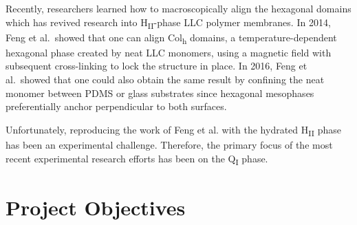 \documentclass{article}
\begin{document}

  Recently, researchers learned how to macroscopically align the hexagonal 
  domains which has revived research into H\textsubscript{II}-phase LLC
  polymer membranes. In 2014, Feng et al.~showed that one can align Col\textsubscript{h}
  domains, a temperature-dependent hexagonal phase created by neat LLC monomers,
  using a magnetic field with subsequent cross-linking to lock the structure 
  in place\cite{feng_scalable_2014}. In 2016, Feng et al.~showed that one could 
  also obtain the same result by confining the neat monomer between PDMS or glass 
  substrates since hexagonal mesophases preferentially anchor perpendicular to 
  both surfaces\cite{feng_thin_2016}.
  
  Unfortunately, reproducing the work of Feng et al. with the hydrated 
  H\textsubscript{II} phase has been an experimental challenge. Therefore, the
  primary focus of the most recent experimental research efforts has been 
  on the Q\textsubscript{I} phase.

  \section{Project Objectives}\label{section:objectives}  
  
\end{document}
